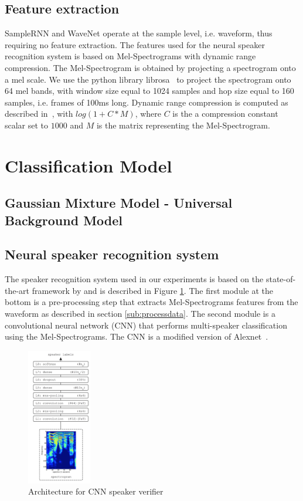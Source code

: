 \subsection{Feature extraction}
SampleRNN and WaveNet operate at the sample level, i.e. waveform, thus requiring no feature extraction.
The features used for the neural speaker recognition system is based on Mel-Spectrograms with dynamic range compression. The Mel-Spectrogram is obtained by projecting a spectrogram onto a mel scale. We use the python library librosa~\cite{mcfee2015librosa} to project the spectrogram onto 64 mel bands, with window size equal to 1024 samples and hop size equal to 160 samples, i.e. frames of 100ms long. Dynamic range compression is computed as described in~\cite{lukic2016speaker}, with $log(1 + C*M)$, where $C$ is the a compression constant scalar set to $1000$ and $M$ is the matrix representing the Mel-Spectrogram.
                        
\section{Classification Model}
\subsection{Gaussian Mixture Model - Universal Background Model}
\subsection{Neural speaker recognition system}
The speaker recognition system used in our experiments is based on the state-of-the-art framework by \cite{lukic2016speaker} and is described in Figure \ref{fig:CNN}. The first module at the bottom is a pre-processing step that extracts Mel-Spectrograms features from the waveform as described in section \ref{sub:processdata}. The second module is a convolutional neural network (CNN) that performs multi-speaker classification using the Mel-Spectrograms. The CNN is a modified version of Alexnet~\cite{krizhevsky2012imagenet}.

\begin{figure}[h]
    \centering
    \includegraphics[width=0.25\textwidth]{./fig/cnn.png}
    \caption{Architecture for CNN speaker verifier}
    \label{fig:CNN}
\end{figure}

